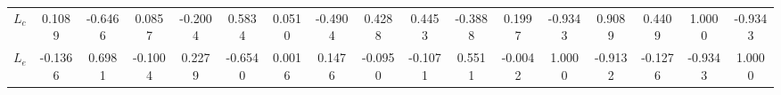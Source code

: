 \begin{center}
\begin{longtable}{lcccccccccccccccc}
${L_c}              $	 & 	               0.1089	 & 	              -0.6466	 & 	               0.0857	 & 	              -0.2004	 & 	               0.5834	 & 	               0.0510	 & 	              -0.4904	 & 	               0.4288	 & 	               0.4453	 & 	              -0.3888	 & 	               0.1997	 & 	              -0.9343	 & 	               0.9089	 & 	               0.4409	 & 	               1.0000	 & 	              -0.9343 \\ 
${L_e}              $	 & 	              -0.1366	 & 	               0.6981	 & 	              -0.1004	 & 	               0.2279	 & 	              -0.6540	 & 	               0.0016	 & 	               0.1476	 & 	              -0.0950	 & 	              -0.1071	 & 	               0.5511	 & 	              -0.0042	 & 	               1.0000	 & 	              -0.9132	 & 	              -0.1276	 & 	              -0.9343	 & 	               1.0000 \\ 
\end{longtable}
 \end{center}
